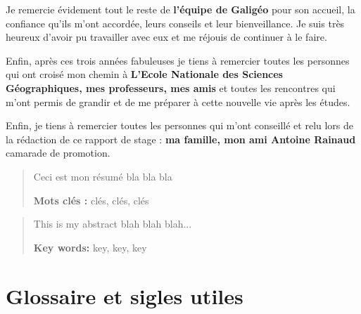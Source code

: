 \documentclass{themeensg}
\begin{document}
Je remercie évidement tout le reste de \textbf{l’équipe de Galigéo} pour son accueil, la confiance qu’ils m’ont accordée, leurs conseils et leur bienveillance. Je suis très heureux d’avoir pu travailler avec eux et me réjouis de continuer à le faire.

Enfin, après ces trois années fabuleuses je tiens à remercier toutes les personnes qui ont croisé mon chemin à \textbf{L’Ecole Nationale des Sciences Géographiques, mes professeurs, mes amis} et toutes les rencontres qui m’ont permis de grandir et de me préparer à cette nouvelle vie après les études.

Enfin, je tiens à remercier toutes les personnes qui m'ont conseillé et relu lors de la rédaction de ce rapport de stage : \textbf{ma famille, mon ami Antoine Rainaud} camarade de promotion.



\begin{abstract}
\thispagestyle{empty}
	\vspace{1cm}

	Ceci est mon résumé bla bla bla
	
	\vspace{1.5cm}
	
	\textbf{Mots clés :} clés, clés, clés
\end{abstract}


\begin{abstract}
\thispagestyle{empty}
	\vspace{1cm}
	
	This is my abstract blah blah blah...
	
	\vspace{1.5cm}
	
	\textbf{Key words:} key, key, key
\end{abstract}


\tableofcontents



\newevenpage
\chapter*{Glossaire et sigles utiles}

  \begin{acronym}
  \end{acronym}
\end{document}
